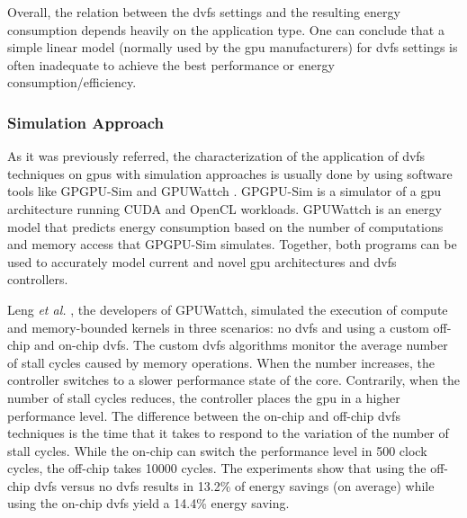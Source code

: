 Overall, the relation between the \acrshort{dvfs} settings and the resulting energy consumption depends heavily on the application type. One can conclude that a simple linear model (normally used by the \acrshort{gpu} manufacturers) for \acrshort{dvfs} settings is often inadequate to achieve the best performance or energy consumption/efficiency.

\subsubsection{Simulation Approach}

As it was previously referred, the characterization of the application of  \acrshort{dvfs} techniques on \acrshort{gpu}s with simulation approaches is usually done by using software tools like GPGPU-Sim \cite{noauthor_gpgpu-sim/gpgpu-sim_distribution_2019} and GPUWattch \cite{noauthor_gpu_2011} \cite{leng_gpuwattch:_2013}. GPGPU-Sim is a simulator of a \acrshort{gpu} architecture running CUDA and OpenCL workloads. GPUWattch is an energy model that predicts energy consumption based on the number of computations and memory access that GPGPU-Sim simulates. Together, both programs can be used to accurately model current and novel \acrshort{gpu} architectures and \acrshort{dvfs} controllers.

Leng \textit{et al.} \cite{leng_gpuwattch:_2013}, the developers of GPUWattch, simulated the execution of compute and memory-bounded kernels in three scenarios: no \acrshort{dvfs} and using a custom off-chip and on-chip \acrshort{dvfs}. The custom \acrshort{dvfs} algorithms monitor the average number of stall cycles caused by memory operations. When the number increases, the controller switches to a slower performance state of the core. Contrarily, when the number of stall cycles reduces, the controller places the \acrshort{gpu} in a higher performance level. The difference between the on-chip and off-chip \acrshort{dvfs} techniques is the time that it takes to respond to the variation of the number of stall cycles. While the on-chip can switch the performance level in 500 clock cycles, the off-chip takes 10000 cycles. The experiments show that using the off-chip \acrshort{dvfs} versus no \acrshort{dvfs} results in 13.2\% of energy savings (on average) while using the on-chip \acrshort{dvfs} yield a 14.4\% energy saving.

